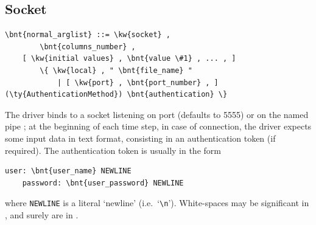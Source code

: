 \subsection{Socket}
\begin{Verbatim}[commandchars=\\\{\}]
    \bnt{normal_arglist} ::= \kw{socket} , 
        \bnt{columns_number} ,
	[ \kw{initial values} , \bnt{value \#1} , ... , ]
        \{ \kw{local} , " \bnt{file_name} " 
            | [ \kw{port} , \bnt{port_number} , ] (\ty{AuthenticationMethod}) \bnt{authentication} \}
\end{Verbatim}
The driver binds to a socket listening on port  
(defaults to 5555) or on the named pipe ; at the
beginning of each time step, in case of connection, the driver expects some
input data in text format, consisting in an authentication token 
(if required).
The authentication token is usually in the form
\begin{Verbatim}[commandchars=\\\{\}]
    user: \bnt{user_name} NEWLINE
    password: \bnt{user_password} NEWLINE
\end{Verbatim}
where \texttt{NEWLINE} is a literal `newline' (i.e.\ `\verb;\n;').
White-spaces may be significant in , 
and surely are in .

